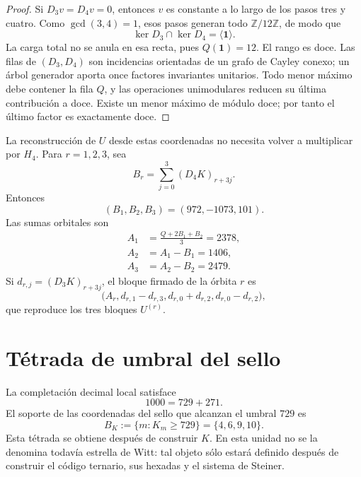 \begin{proof}
Si \(D_3v=D_4v=0\), entonces \(v\) es constante a lo largo de los pasos
tres y cuatro. Como \(\gcd(3,4)=1\), esos pasos generan todo
\(\mathbb Z/12\mathbb Z\), de modo que
\[
 \ker D_3\cap\ker D_4=\langle\mathbf1\rangle.
\]
La carga total no se anula en esa recta, pues \(Q(\mathbf1)=12\). El rango
es doce. Las filas de \((D_3,D_4)\) son incidencias orientadas de un grafo
de Cayley conexo; un árbol generador aporta once factores invariantes
unitarios. Todo menor máximo debe contener la fila \(Q\), y las operaciones
unimodulares reducen su última contribución a doce. Existe un menor máximo de
módulo doce; por tanto el último factor es exactamente doce.
\end{proof}

La reconstrucción de \(U\) desde estas coordenadas no necesita volver a
multiplicar por \(H_4\). Para \(r=1,2,3\), sea
\begin{equation}
 B_r=\sum_{j=0}^{3}(D_4K)_{r+3j}.
 \label{eq:br-diferencias-k}
\end{equation}
Entonces
\[
 (B_1,B_2,B_3)=(972,-1073,101).
\]
Las sumas orbitales son
\begin{align}
 A_1&=\frac{Q+2B_1+B_2}{3}=2378,
 \label{eq:a1-reconstruccion-u}\\
 A_2&=A_1-B_1=1406,
 \label{eq:a2-reconstruccion-u}\\
 A_3&=A_2-B_2=2479.
 \label{eq:a3-reconstruccion-u}
\end{align}
Si \(d_{r,j}=(D_3K)_{r+3j}\), el bloque firmado de la órbita \(r\) es
\begin{equation}
 \bigl(A_r,
 d_{r,1}-d_{r,3},
 d_{r,0}+d_{r,2},
 d_{r,0}-d_{r,2}\bigr),
 \label{eq:bloque-firmado-desde-diferencias}
\end{equation}
que reproduce los tres bloques \(U^{(r)}\).

\section{Tétrada de umbral del sello}

La completación decimal local satisface
\[
 1000=729+271.
\]
El soporte de las coordenadas del sello que alcanzan el umbral \(729\) es
\begin{equation}
 \boxed{
 B_K:=\{m:K_m\geq729\}=\{4,6,9,10\}.}
 \label{eq:tetrada-umbral-k}
\end{equation}
Esta tétrada se obtiene después de construir \(K\). En esta unidad no se la
denomina todavía estrella de Witt: tal objeto sólo estará definido después
de construir el código ternario, sus hexadas y el sistema de Steiner.

